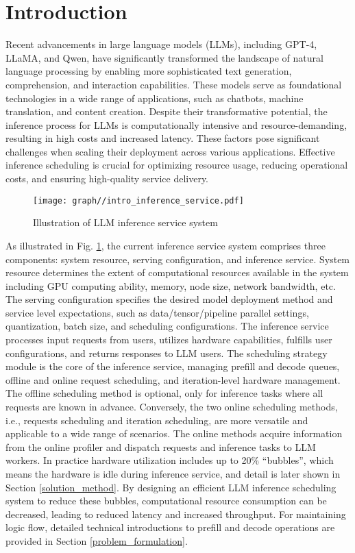\section{Introduction}
\label{introduction}
Recent advancements in large language models (LLMs), including GPT-4, LLaMA, and Qwen, have significantly transformed the landscape of natural language processing by enabling more sophisticated text generation, comprehension, and interaction capabilities. These models serve as foundational technologies in a wide range of applications, such as chatbots, machine translation, and content creation. Despite their transformative potential, the inference process for LLMs is computationally intensive and resource-demanding, resulting in high costs and increased latency. These factors pose significant challenges when scaling their deployment across various applications. Effective inference scheduling is crucial for optimizing resource usage, reducing operational costs, and ensuring high-quality service delivery.

\begin{figure}
    \centering
    \texttt{[image: graph//intro\_inference\_service.pdf]}
    \caption{Illustration of LLM inference service system}
    \label{fig:intro_inference_service}
\end{figure}

As illustrated in Fig. \ref{fig:intro_inference_service}, the current inference service system comprises three components: system resource, serving configuration, and inference service. System resource determines the extent of computational resources available in the system including GPU computing ability, memory, node size, network bandwidth, etc. The serving configuration specifies the desired model deployment method and service level expectations, such as data/tensor/pipeline parallel settings, quantization, batch size, and scheduling configurations. The inference service processes input requests from users, utilizes hardware capabilities, fulfills user configurations, and returns responses to LLM users. The scheduling strategy module is the core of the inference service, managing prefill and decode queues, offline and online request scheduling, and iteration-level hardware management. The offline scheduling method is optional, only for inference tasks where all requests are known in advance. Conversely, the two online scheduling methods, i.e., requests scheduling and iteration scheduling, are more versatile and applicable to a wide range of scenarios. The online methods acquire information from the online profiler and dispatch requests and inference tasks to LLM workers. In practice hardware utilization includes up to 20\% ``bubbles'', which means the hardware is idle during inference service, and detail is later shown in Section \ref{solution_method}. By designing an efficient LLM inference scheduling system to reduce these bubbles, computational resource consumption can be decreased, leading to reduced latency and increased throughput. For maintaining logic flow, detailed technical introductions to prefill and decode operations are provided in Section \ref{problem_formulation}.

